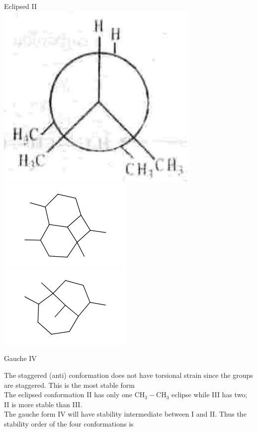 \documentclass[10pt]{article}
\begin{document}
Eclipsed II\\
\includegraphics[max width=\textwidth, center]{2025_01_28_8470952b98110cec3aabg-122}\\
\includegraphics{smile-6ff526352640926cbce06dfcd336ef30e8488c9b}\\
\includegraphics{smile-9552a46f13de9f5b87ba362726e6036b2396c0c4}

Gauche IV

The staggered (anti) conformation does not have torsional strain since the groups are staggered. This is the most stable form\\
The eclipsed conformation II has only one $\mathrm{CH}_{3}-\mathrm{CH}_{3}$ eclipse while III has two; II is more stable than III.\\
The gauche form IV will have stability intermediate between I and II. Thus the stability order of the four conformations is
\end{document}
